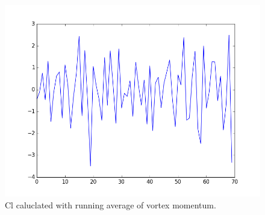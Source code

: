 \documentclass[a4paper,11pt]{article}
\begin{document}
\begin{figure}[ht]
    \centering
    \includegraphics[width=.8\linewidth]{Cl_re1000.png}
    \caption{Cl caluclated with running average of vortex momentum.}
    \label{fig:cl}    
\end{figure}
\end{document}
